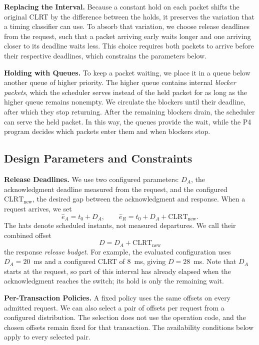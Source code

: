 \textbf{Replacing the Interval.} Because a constant hold on each packet shifts the original CLRT by the difference between the
holds, it preserves the variation that a timing classifier can use. To absorb that variation, we choose release deadlines from the request, such that a packet arriving
early waits longer and one arriving closer to its deadline waits less. This choice requires
both packets to arrive before their respective deadlines, which constrains the parameters below.

\textbf{Holding with Queues.} To keep a packet waiting, we place it in a queue below another queue
of higher priority. The higher queue contains internal \emph{blocker packets}, which the scheduler serves instead of
the held packet for as long as the higher queue remains nonempty. We circulate the
blockers until their deadline, after which they stop returning. After the remaining blockers drain, the scheduler can serve the held packet. In this way, the
queues provide the wait, while the P4 program decides which packets enter them and when blockers stop.

\subsection{Design Parameters and Constraints}
\label{sec:design:read}

\textbf{Release Deadlines.} We use two configured parameters: $D_A$, the acknowledgment deadline
measured from the request, and the configured $\mathrm{CLRT}_{\mathrm{new}}$, the desired gap
between the acknowledgment and response. When a request arrives, we set
\begin{equation}
\label{eq:schedule}
\hat{e}_A=t_0+D_A, \qquad
\hat{e}_R=t_0+D_A+\mathrm{CLRT}_{\mathrm{new}}.
\end{equation}
The hats denote scheduled instants, not measured departures. We call their combined offset
\begin{equation}
\label{eq:budget}
D=D_A+\mathrm{CLRT}_{\mathrm{new}}
\end{equation}
the response \emph{release budget}. For example, the evaluated configuration uses $D_A=20$~ms and
a configured CLRT of 8~ms, giving $D=28$~ms. Note that $D_A$ starts at the request, so part of this interval has already elapsed when the
acknowledgment reaches the switch; its hold is only the remaining wait.

\textbf{Per-Transaction Policies.} A fixed policy uses the same offsets on every admitted request.
We can also select a pair of offsets per request from a configured distribution. The selection does
not use the operation code, and the chosen offsets remain fixed for that transaction. The
availability conditions below apply to every selected pair.

